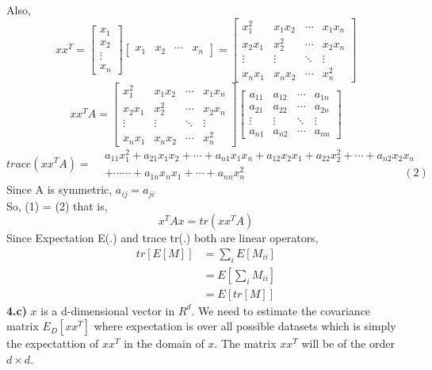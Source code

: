 \documentclass[17pt]{article}
\begin{document}
Also,
$$xx^T = { 
	{\begin{bmatrix}x_{1}\\x_{2}\\\vdots\\x_{n}\end{bmatrix}}
	{\begin{bmatrix}x_{1}&x_{2}&\cdots&x_{n}\end{bmatrix}}	
} = \begin{bmatrix}
   		x_{1}^2 &x_{1}x_{2} &\cdots &x_{1}x_{n}\\
   		x_{2}x_{1} &x_{2}^2 &\cdots &x_{2}x_{n}\\
   		\vdots &\vdots &\ddots &\vdots\\
   		x_{n}x_{1} &x_{n}x_{2} &\cdots &x_{n}^2
   	\end{bmatrix}
$$
$$xx^TA = {
	{\begin{bmatrix}
   		x_{1}^2 &x_{1}x_{2} &\cdots &x_{1}x_{n}\\
   		x_{2}x_{1} &x_{2}^2 &\cdots &x_{2}x_{n}\\
   		\vdots &\vdots &\ddots &\vdots\\
   		x_{n}x_{1} &x_{n}x_{2} &\cdots &x_{n}^2
	   	\end{bmatrix}}
{\begin{bmatrix}
   		a_{11}&a_{12}&\cdots &a_{1n}\\
   		a_{21}&a_{22}&\cdots &a_{2n}\\
   		\vdots &\vdots &\ddots &\vdots\\
   		a_{n1}&a_{n2}&\cdots &a_{nn}					\end{bmatrix}}
}
$$
$$trace(xx^TA) = {\begin{split}	 
				& a_{11}x_{1}^2 + a_{21}x_{1}x_{2} +\cdots + a_{n1}x_{1}x_{n} +a_{12}x_{2}x_{1}+a_{22}x_{2}^2+\cdots + a_{n2}x_{2}x_{n}\\
				& +\cdots\cdots+a_{1n}x_{n	}x_{1}+\cdots+a_{nn}x_{n}^2 \hspace{6cm}(2)  
	 		\end{split}
	 	   }$$
Since A is symmetric, $a_{ij} = a_{ji}$\\
So, (1) = (2) that is,
$$x^TAx = tr(xx^TA)$$
Since Expectation E(.) and trace tr(.) both are linear operators,
\begin{equation*}
\begin{aligned}
tr[E[M]] &= \sum_{i} E[ M_{ii} ]\\
	     &=  E[ \sum_{i} M_{ii} ] \\
   	     &=  E[ tr [M] ] 
\end{aligned}
\end{equation*}
\textbf{4.c)} $x$ is a d-dimensional vector in $R^{d}$. We need to estimate the covariance matrix $E_{D}[xx^{T}]$ where expectation is over all possible datasets which is simply the expectattion of $xx^{T}$ in the domain of $x$. The matrix $xx^{T}$ will be of the order $d \times d$.
\end{document}
